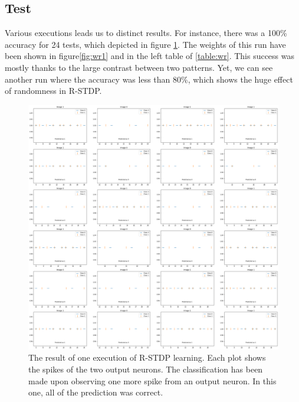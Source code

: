 \documentclass{article}
\begin{document}
	\subsection{Test}
	Various executions leads us to distinct results. For instance, there was a 100\% accuracy for 24 tests, which depicted in figure \ref{fig:rtest1}. The weights of this run have been shown in figure\ref{fig:wr1} and in the left table of \ref{table:wr}. This success was mostly thanks to the large contrast between two patterns. Yet, we can see another run where the accuracy was less than 80\%, which shows the huge effect of randomness in R-STDP.
	\begin{figure}[h]
		\includegraphics[width=\textwidth]{rstdp_test1.png}
		\caption{The result of one execution of R-STDP learning. Each plot shows the spikes of the two output neurons. The classification has been made upon observing one more spike from an output neuron. In this one, all of the prediction was correct.}
		\label{fig:rtest1}
	\end{figure}
\end{document}
